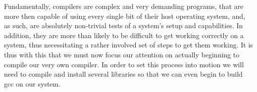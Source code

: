 \documentclass[]{article}
\begin{document}
                                                                                                                                                Fundamentally, compilers are complex and very demanding programs, that are more then capable of using every single bit of
                                                                                                                                                their host operating system, and, as such, are absolutely non-trivial tests of a system's setup and capabilities. In addition, they are
                                                                                                                                                more than likely to be difficult to get working correctly on a system, thus necessitating a rather involved set of steps to get them
                                                                                                                                                working. It is thus with this that we must now focus our attention on  actually beginning to compile our very own compiler. In order to
                                                                                                                                                set this process into motion we will need to compile and install several libraries so that we can even begin to build gcc on our system.
\end{document}
